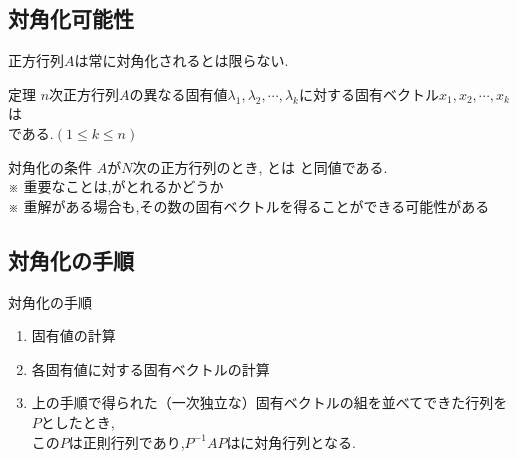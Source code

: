 \documentclass[a4paper]{jsarticle}
\begin{document}
\subsection{対角化可能性}
正方行列$A$は常に対角化されるとは限らない.
\begin{itembox}[l]{定理}
    $n$次正方行列$A$の異なる固有値$\lambda_1,\lambda_2,\cdots,\lambda_k$に対する固有ベクトル$x_1,x_2,\cdots,x_k$は\\
    である.$\left(1\leq k\leq n\right)$
\end{itembox}
\begin{itembox}[l]{対角化の条件}
    $A$が$N$次の正方行列のとき, とは
    と同値である.\\
    ※ 重要なことは,がとれるかどうか\\
    ※ 重解がある場合も,その数の固有ベクトルを得ることができる可能性がある
\end{itembox}
\subsection{対角化の手順}
\begin{itembox}[l]{対角化の手順}
    \begin{enumerate}[(1)]
        \item 固有値の計算
        \item 各固有値に対する固有ベクトルの計算
        \item 上の手順で得られた（一次独立な）固有ベクトルの組を並べてできた行列を$P$としたとき,\\
              この$P$は正則行列であり,$P^{-1}AP$はに対角行列となる.
    \end{enumerate}
\end{itembox}
\end{document}
